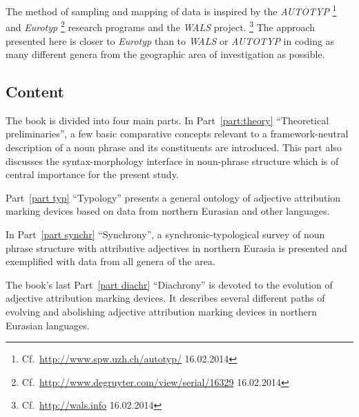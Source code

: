The method of sampling and mapping of data is inspired by the \emph{AUTOTYP}
\footnote{Cf.~\url{http://www.spw.uzh.ch/autotyp/} 16.02.2014}
 and \emph{Eurotyp}
 \footnote{Cf.~\url{http://www.degruyter.com/view/serial/16329} 16.02.2014}
  research programs and the \emph{WALS} project.
  \footnote{Cf.~\url{http://wals.info} 16.02.2014}
   The approach presented here is closer to \emph{Eurotyp} than to \emph{WALS} or \emph{AUTOTYP} in coding as many different genera from the geographic area of investigation as possible.

\subsection*{Content}
The book is divided into four main parts. In Part~\ref{part:theory} “Theoretical preliminaries”, a few basic comparative concepts relevant to a framework-neutral description of a noun phrase and its constituents are introduced. This part also discusses the syntax-morphology interface in noun-phrase structure which is of central importance for the present study.

Part~\ref{part typ} “Typology” presents a general ontology of adjective attribution marking devices based on data from northern Eurasian and other languages.

In Part~\ref{part synchr} “Synchrony”, a synchronic-typological survey of noun phrase structure with attributive adjectives in northern Eurasia is presented and exemplified with data from all genera of the area.

The book's last Part~\ref{part diachr} “Diachrony” is devoted to the evolution of adjective attribution marking devices. It describes several different paths of evolving and abolishing adjective attribution marking devices in northern Eurasian languages.
